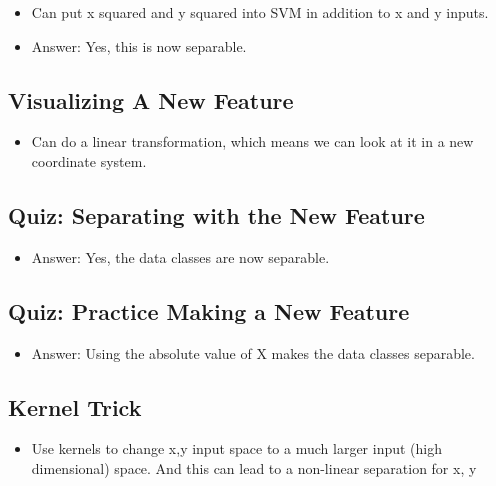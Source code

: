 \documentclass[12pt]{report}
\begin{document}
\begin{itemize}

\item Can put x squared and y squared into SVM in addition to x and y inputs. 

\item Answer: Yes, this is now separable. 

\end{itemize}


\subsection{Visualizing A New Feature}

\begin{itemize}

\item Can do a linear transformation, which means we can look at it in a new coordinate system. 

\end{itemize}

\subsection{Quiz: Separating with the New Feature}

\begin{itemize}

\item Answer: Yes, the data classes are now separable. 

\end{itemize}

\subsection{Quiz: Practice Making a New Feature}

\begin{itemize}

\item Answer: Using the absolute value of X makes the data classes separable. 

\end{itemize}


\subsection{Kernel Trick}

\begin{itemize}

\item Use kernels to change x,y input space to a much larger input (high dimensional) space. And this can lead to a non-linear separation for x, y

\end{itemize}
\end{document}
